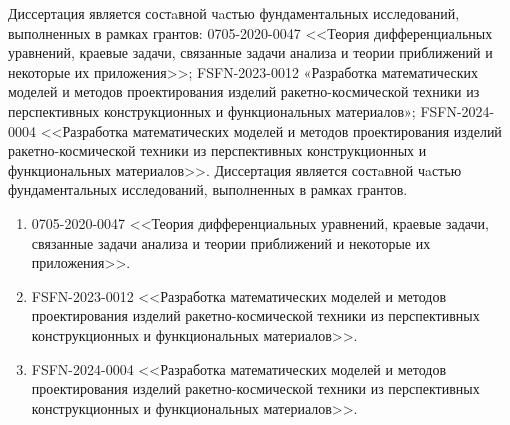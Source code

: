 \ifsynopsis
Диссертация является состaвной чaстью фундаментальных исследований, выполненных в рамках грантов: 0705-2020-0047 <<Теория дифференциальных уравнений, краевые задачи, связанные задачи анализа и теории приближений и некоторые их приложения>>; FSFN-2023-0012 «Разработка математических моделей и методов проектирования изделий ракетно-космической техники из перспективных конструкционных и функциональных материалов»; FSFN-2024-0004 <<Разработка математических моделей и методов проектирования изделий ракетно-космической техники из перспективных конструкционных и функциональных материалов>>.
\else
Диссертация является состaвной чaстью фундаментальных исследований, выполненных в рамках грантов.
\begin{enumerate}
	\item 0705-2020-0047 <<Теория дифференциальных уравнений, краевые задачи, связанные задачи анализа и теории приближений и некоторые их приложения>>.
	\item FSFN-2023-0012 <<Разработка математических моделей и методов проектирования изделий ракетно-космической техники из перспективных конструкционных и функциональных материалов>>.
	\item FSFN-2024-0004 <<Разработка математических моделей и методов проектирования изделий ракетно-космической техники из перспективных конструкционных и функциональных материалов>>.
\end{enumerate}
\fi

